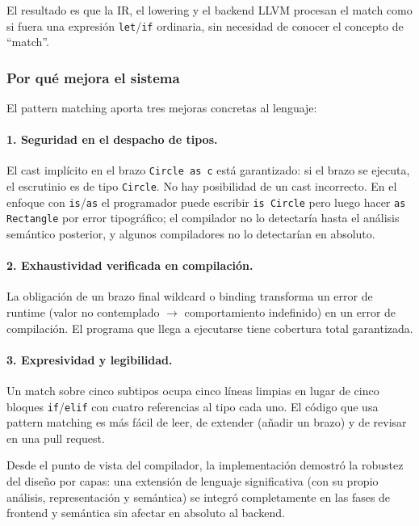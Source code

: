 \documentclass[12pt,letterpaper]{article}
\newcommand{\src}[1]{\texttt{#1}}
\begin{document}
El resultado es que la IR, el lowering y el backend LLVM procesan el match como si fuera una expresión \src{let}/\src{if} ordinaria, sin necesidad de conocer el concepto de ``match''.

\subsubsection{Por qué mejora el sistema}

El pattern matching aporta tres mejoras concretas al lenguaje:

\paragraph{1. Seguridad en el despacho de tipos.} El cast implícito en el brazo \src{Circle as c} está garantizado: si el brazo se ejecuta, el escrutinio es de tipo \src{Circle}. No hay posibilidad de un cast incorrecto. En el enfoque con \src{is}/\src{as} el programador puede escribir \src{is Circle} pero luego hacer \src{as Rectangle} por error tipográfico; el compilador no lo detectaría hasta el análisis semántico posterior, y algunos compiladores no lo detectarían en absoluto.

\paragraph{2. Exhaustividad verificada en compilación.} La obligación de un brazo final wildcard o binding transforma un error de runtime (valor no contemplado $\to$ comportamiento indefinido) en un error de compilación. El programa que llega a ejecutarse tiene cobertura total garantizada.

\paragraph{3. Expresividad y legibilidad.} Un match sobre cinco subtipos ocupa cinco líneas limpias en lugar de cinco bloques \src{if}/\src{elif} con cuatro referencias al tipo cada uno. El código que usa pattern matching es más fácil de leer, de extender (añadir un brazo) y de revisar en una pull request.

Desde el punto de vista del compilador, la implementación demostró la robustez del diseño por capas: una extensión de lenguaje significativa (con su propio análisis, representación y semántica) se integró completamente en las fases de frontend y semántica sin afectar en absoluto al backend.

\end{document}
